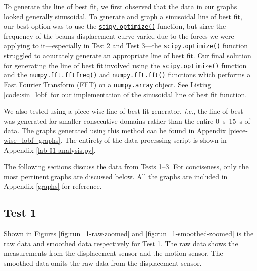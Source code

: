 \documentclass[12 pt]{report}
\newcommand{\ie}{\textit{i}.\textit{e}., }
\begin{document}
To generate the line of best fit, we first observed that the data in our graphs looked generally sinusoidal. To generate and graph a sinusoidal line of best fit, our best option was to use the \href{https://docs.scipy.org/doc/scipy/tutorial/optimize.html}{\texttt{scipy.optimize()}} function, but since the frequency of the beams displacement curve varied due to the forces we were applying to it---especially in Test \num{2} and Test \num{3}---the \texttt{scipy.optimize()} function struggled to accurately generate an appropriate line of best fit. Our final solution for generating the line of best fit involved using the \texttt{scipy.optimize()} function and the \href{https://numpy.org/doc/stable/reference/generated/numpy.fft.fftfreq.html}{\texttt{numpy.fft.fftfreq()}} and \href{https://numpy.org/doc/stable/reference/generated/numpy.fft.fft.html}{\texttt{numpy.fft.fft()}} functions which performs a \href{https://en.wikipedia.org/wiki/Fast_Fourier_transform}{Fast Fourier Transform} (FFT) on a \href{https://numpy.org/doc/stable/reference/generated/numpy.array.html}{\texttt{numpy.array}} object. See Listing \ref{code:sin_lobf} for our implementation of the sinusoidal line of best fit function.



We also tested using a piece-wise line of best fit generator, \ie the line of best was generated for smaller consecutive domains rather than the entire \qtyrange{0}{15}{\s} of data. The graphs generated using this method can be found in Appendix \ref{piece-wise_lobf_graphs}. The entirety of the data processing script is shown in Appendix \ref{lab-01-analysis.py}.

The following sections discuss the data from Tests \num{1}--\num{3}. For conciseness, only the most pertinent graphs are discussed below. All the graphs are included in Appendix \ref{graphs} for reference.

\subsection{Test 1} \label{data-test_1}
Shown in Figures \ref{fig:run_1-raw-zoomed} and \ref{fig:run_1-smoothed-zoomed} is the raw data and smoothed data respectively for Test \num{1}. The raw data shows the measurements from the displacement sensor and the motion sensor. The smoothed data omits the raw data from the displacement sensor.
\end{document}
